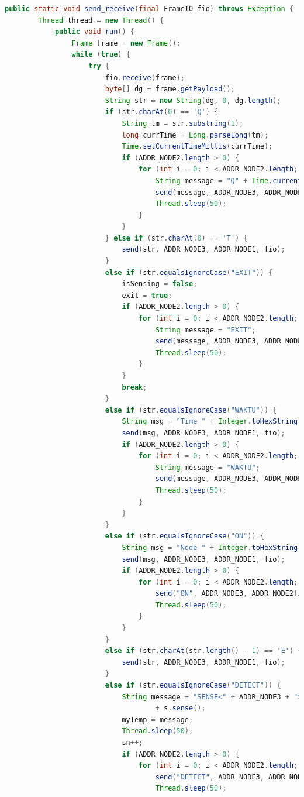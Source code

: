 \begin{lstlisting}[label=send_receive_ns, language=Java, caption=Metode send\_receive pada kelas NS, numbers=none]
public static void send_receive(final FrameIO fio) throws Exception {
		Thread thread = new Thread() {
			public void run() {
				Frame frame = new Frame();
				while (true) {
					try {
						fio.receive(frame);
						byte[] dg = frame.getPayload();
						String str = new String(dg, 0, dg.length);
						if (str.charAt(0) == 'Q') {
							String tm = str.substring(1);
							long currTime = Long.parseLong(tm);
							Time.setCurrentTimeMillis(currTime);
							if (ADDR_NODE2.length > 0) {
								for (int i = 0; i < ADDR_NODE2.length; i++) {
									String message = "Q" + Time.currentTimeMillis();
									send(message, ADDR_NODE3, ADDR_NODE2[i], fio);
									Thread.sleep(50);
								}
							}
						} else if (str.charAt(0) == 'T') {
							send(str, ADDR_NODE3, ADDR_NODE1, fio);
						}
						else if (str.equalsIgnoreCase("EXIT")) {
							isSensing = false;
							exit = true;
							if (ADDR_NODE2.length > 0) {
								for (int i = 0; i < ADDR_NODE2.length; i++) {
									String message = "EXIT";
									send(message, ADDR_NODE3, ADDR_NODE2[i], fio);
									Thread.sleep(50);
								}
							}
							break;
						}
						else if (str.equalsIgnoreCase("WAKTU")) {
							String msg = "Time " + Integer.toHexString(ADDR_NODE3) + " " + Time.currentTimeMillis();
							send(msg, ADDR_NODE3, ADDR_NODE1, fio);
							if (ADDR_NODE2.length > 0) {
								for (int i = 0; i < ADDR_NODE2.length; i++) {
									String message = "WAKTU";
									send(message, ADDR_NODE3, ADDR_NODE2[i], fio);
									Thread.sleep(50);
								}
							}
						}
						else if (str.equalsIgnoreCase("ON")) {
							String msg = "Node " + Integer.toHexString(ADDR_NODE3) + " ONLINE";
							send(msg, ADDR_NODE3, ADDR_NODE1, fio);
							if (ADDR_NODE2.length > 0) {
								for (int i = 0; i < ADDR_NODE2.length; i++) {
									send("ON", ADDR_NODE3, ADDR_NODE2[i], fio);
									Thread.sleep(50);
								}
							}
						}
						else if (str.charAt(str.length() - 1) == 'E') {
							send(str, ADDR_NODE3, ADDR_NODE1, fio);
						}
						else if (str.equalsIgnoreCase("DETECT")) {
							String message = "SENSE<" + ADDR_NODE3 + ">" + sn + "?" + Time.currentTimeMillis() + " "
									+ s.sense();
							myTemp = message;
							Thread.sleep(50);
							sn++;
							if (ADDR_NODE2.length > 0) {
								for (int i = 0; i < ADDR_NODE2.length; i++) {
									send("DETECT", ADDR_NODE3, ADDR_NODE2[i], fio);
									Thread.sleep(50);

\end{lstlisting}

